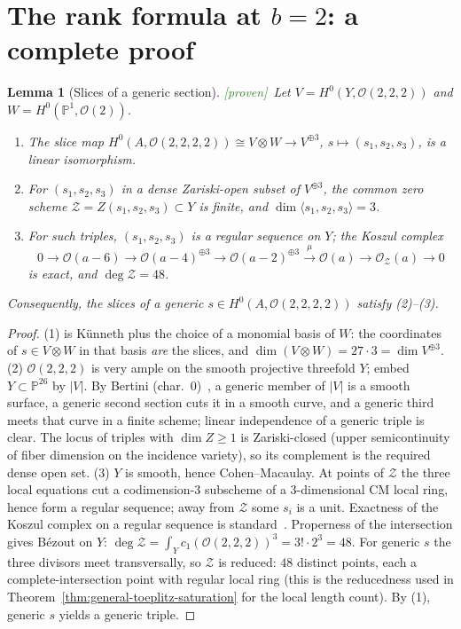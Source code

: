\documentclass[11pt]{article}
\theoremstyle{plain}
\newtheorem{lemma}[theorem]{Lemma}
\theoremstyle{definition}
\theoremstyle{remark}
\newcommand{\Proven}{\textcolor{ForestGreen}{\textsf{[proven]}}}
\newcommand{\PP}{\mathbb{P}}
\newcommand{\cO}{\mathcal{O}}
\newcommand{\cZ}{\mathcal{Z}}
\begin{document}
\section{The rank formula at \texorpdfstring{$b=2$}{b=2}: a complete proof}\label{sec:b2}

\begin{lemma}[Slices of a generic section]\label{lem:slices}
\Proven\ Let $V=H^0(Y,\cO(2,2,2))$ and $W=H^0(\PP^1,\cO(2))$.
\begin{enumerate}[leftmargin=2.2em,itemsep=2pt]
\item The slice map $H^0(A,\cO(2,2,2,2))\cong V\otimes W\to V^{\oplus 3}$, $s\mapsto(s_1,s_2,s_3)$, is a linear isomorphism.
\item For $(s_1,s_2,s_3)$ in a dense Zariski-open subset of $V^{\oplus 3}$, the common zero scheme $\cZ=Z(s_1,s_2,s_3)\subset Y$ is finite, and $\dim\langle s_1,s_2,s_3\rangle=3$.
\item For such triples, $(s_1,s_2,s_3)$ is a regular sequence on $Y$; the Koszul complex
\begin{equation}\label{eq:koszulres}
0\to\cO(a-6)\to\cO(a-4)^{\oplus 3}\to\cO(a-2)^{\oplus 3}\xrightarrow{\;\mu\;}\cO(a)\to\cO_{\cZ}(a)\to 0
\end{equation}
is exact, and $\deg\cZ=48$.
\end{enumerate}
Consequently, the slices of a \emph{generic} $s\in H^0(A,\cO(2,2,2,2))$ satisfy (2)--(3).
\end{lemma}

\begin{proof}
(1) is K\"unneth plus the choice of a monomial basis of $W$: the coordinates of $s\in V\otimes W$ in that basis \emph{are} the slices, and $\dim(V\otimes W)=27\cdot 3=\dim V^{\oplus 3}$.
(2) $\cO(2,2,2)$ is very ample on the smooth projective threefold $Y$; embed $Y\subset\PP^{26}$ by $|V|$. By Bertini (char.~$0$)~\cite[II.8.18, III.7.9.1]{Hartshorne}, a generic member of $|V|$ is a smooth surface, a generic second section cuts it in a smooth curve, and a generic third meets that curve in a finite scheme; linear independence of a generic triple is clear. The locus of triples with $\dim Z\ge 1$ is Zariski-closed (upper semicontinuity of fiber dimension on the incidence variety), so its complement is the required dense open set.
(3) $Y$ is smooth, hence Cohen--Macaulay. At points of $\cZ$ the three local equations cut a codimension-$3$ subscheme of a $3$-dimensional CM local ring, hence form a regular sequence; away from $\cZ$ some $s_i$ is a unit. Exactness of the Koszul complex on a regular sequence is standard~\cite[Cor.~17.5]{Eisenbud}. Properness of the intersection gives B\'ezout on $Y$: $\deg\cZ=\int_Y c_1(\cO(2,2,2))^3=3!\cdot 2^3=48$. For generic $s$ the three divisors meet transversally, so $\cZ$ is reduced: $48$ distinct points, each a complete-intersection point with regular local ring (this is the reducedness used in Theorem~\ref{thm:general-toeplitz-saturation} for the local length count). By (1), generic $s$ yields a generic triple.
\end{proof}
\end{document}

